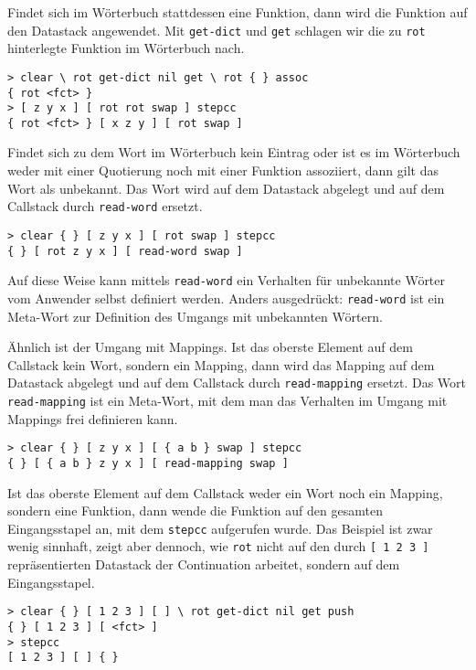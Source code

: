 Findet sich im Wörterbuch stattdessen eine Funktion, dann wird die Funktion auf den Datastack angewendet. Mit \verb|get-dict| und \verb|get| schlagen wir die zu \verb|rot| hinterlegte Funktion im Wörterbuch nach.

\begin{verbatim}
> clear \ rot get-dict nil get \ rot { } assoc
{ rot <fct> }
> [ z y x ] [ rot rot swap ] stepcc
{ rot <fct> } [ x z y ] [ rot swap ]
\end{verbatim}

Findet sich zu dem Wort im Wörterbuch kein Eintrag oder ist es im Wörterbuch weder mit einer Quotierung noch mit einer Funktion assoziiert, dann gilt das Wort als unbekannt. Das Wort wird auf dem Datastack abgelegt und auf dem Callstack durch \verb|read-word| ersetzt.

\begin{verbatim}
> clear { } [ z y x ] [ rot swap ] stepcc
{ } [ rot z y x ] [ read-word swap ]
\end{verbatim}

Auf diese Weise kann mittels \verb|read-word| ein Verhalten für unbekannte Wörter vom Anwender selbst definiert werden.
Anders ausgedrückt: \verb|read-word| ist ein Meta-Wort zur Definition des Umgangs mit unbekannten Wörtern.

Ähnlich ist der Umgang mit Mappings. Ist das oberste Element auf dem Callstack kein Wort, sondern ein Mapping, dann wird das Mapping auf dem Datastack abgelegt und auf dem Callstack durch \verb|read-mapping| ersetzt. Das Wort \verb|read-mapping| ist ein Meta-Wort, mit dem man das Verhalten im Umgang mit Mappings frei definieren kann.

\begin{verbatim}
> clear { } [ z y x ] [ { a b } swap ] stepcc
{ } [ { a b } z y x ] [ read-mapping swap ]
\end{verbatim}

Ist das oberste Element auf dem Callstack weder ein Wort noch ein Mapping, sondern eine Funktion, dann wende die Funktion auf den gesamten Eingangsstapel an, mit dem \verb|stepcc| aufgerufen wurde. Das Beispiel ist zwar wenig sinnhaft, zeigt aber dennoch, wie \verb|rot| nicht auf den durch \verb|[ 1 2 3 ]| repräsentierten Datastack der Continuation arbeitet, sondern auf dem Eingangsstapel.

\begin{verbatim}
> clear { } [ 1 2 3 ] [ ] \ rot get-dict nil get push
{ } [ 1 2 3 ] [ <fct> ]
> stepcc
[ 1 2 3 ] [ ] { }
\end{verbatim}


